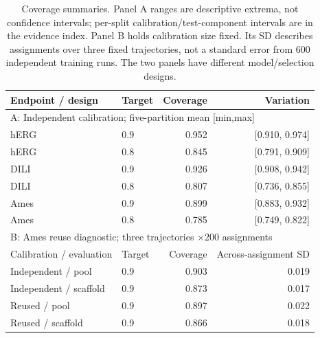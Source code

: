 \begin{table}[t]
\centering
\caption{Coverage summaries. Panel A ranges are descriptive extrema, not confidence intervals; per-split calibration/test-component intervals are in the evidence index. Panel B holds calibration size fixed. Its SD describes assignments over three fixed trajectories, not a standard error from 600 independent training runs. The two panels have different model/selection designs.}\label{tab:cp}
\small
\begin{tabular}{llrr}
\toprule
Endpoint / design & Target & Coverage & Variation\\
\midrule
\multicolumn{4}{l}{A: Independent calibration; five-partition mean [min,max]}\\
hERG & 0.9 & 0.952 & [0.910, 0.974]\\
hERG & 0.8 & 0.845 & [0.791, 0.909]\\
DILI & 0.9 & 0.926 & [0.908, 0.942]\\
DILI & 0.8 & 0.807 & [0.736, 0.855]\\
Ames & 0.9 & 0.899 & [0.883, 0.932]\\
Ames & 0.8 & 0.785 & [0.749, 0.822]\\
\midrule
\multicolumn{4}{l}{B: Ames reuse diagnostic; three trajectories $\times$200 assignments}\\
Calibration / evaluation & Target & Coverage & Across-assignment SD\\
Independent / pool & 0.9 & 0.903 & 0.019\\
Independent / scaffold & 0.9 & 0.873 & 0.017\\
Reused / pool & 0.9 & 0.897 & 0.022\\
Reused / scaffold & 0.9 & 0.866 & 0.018\\
\bottomrule
\end{tabular}
\end{table}
